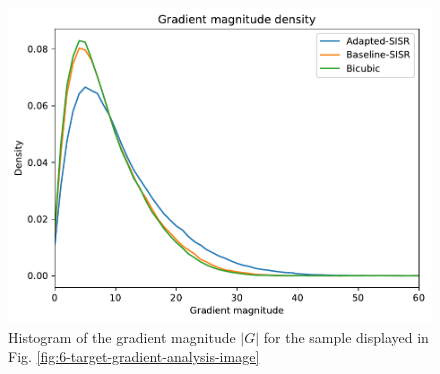            \begin{figure}[ht!]
                \centering
                \includegraphics[scale=0.6]{Includes/6-target-gradient-analysis-histogram.pdf}
                \caption{Histogram of the gradient magnitude $|G|$ for the sample displayed in Fig. \ref{fig:6-target-gradient-analysis-image}}
                \label{fig:6-target-gradient-analysis-histogram}
            \end{figure}
        
        
    